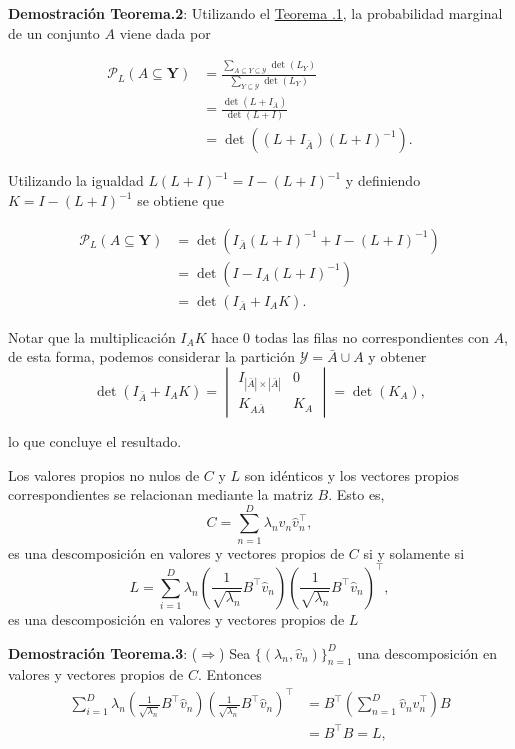 \begin{appendixs}
    \textbf{Demostración Teorema.2}: 
    Utilizando el \hyperlink{Teorema .1}{Teorema .1}, la probabilidad marginal de un conjunto $A$ viene dada por 

    \begin{align*}
    \mathcal{P}_{L}(A \subseteq \mathbf{Y}) & = \frac{\sum_{A \subseteq Y \subseteq \mathcal{Y}}\det(L_Y)}{\sum_{Y \subseteq \mathcal{Y}}\det(L_Y)} \\
    & = \frac{\det(L + I_{\bar{A}})}{\det(L+I)} \\
    & = \det((L + I_{\bar{A}})(L+I)^{-1}) . 
    \end{align*}
    
    Utilizando la igualdad $L(L+I)^{-1} = I - (L+I)^{-1}$ y definiendo $K = I - (L+I)^{-1}$ se obtiene que 
    
    \begin{align*}
    \mathcal{P}_L(A \subseteq \mathbf{Y}) & = \det(I_{\bar{A}}(L+I)^{-1} + I - (L+I)^{-1}) \\
    & = \det(I - I_{A}(L+I)^{-1}) \\
    &= \det(I_{\bar{A}} + I_{A}K) . 
    \end{align*} 
    
    Notar que la multiplicación $I_{A}K$ hace $0$ todas las filas no correspondientes con $A$, de esta forma, podemos considerar la partición $\mathcal{Y} = \bar{A} \cup A$ y obtener
    \[
    \det(I_{\bar{A}} + I_{A}K) = 
    \begin{vmatrix}
    I_{|\bar{A}| \times |\bar{A}| } & 0 \\
    K_{A\bar{A}} & K_A
    \end{vmatrix} = 
    \det(K_A) , 
    \]
    
    lo que concluye el resultado. 
    
    \begin{teo}\hypertarget{Teorema .3}{}
    Los valores propios no nulos de $C$ y $L$ son idénticos y los vectores propios correspondientes se relacionan mediante la matriz $B$. Esto es, 
    \[ 
    C = \sum_{n=1}^D \lambda_n\hat{v}_n\hat{v}^{\top}_n , 
    \]
    es una descomposición en valores y vectores propios de $C$ si y solamente si 
    \[
    L = \sum_{i=1}^D \lambda_n \left ( \frac{1}{\sqrt{\lambda_n}}B^{\top}\hat{v}_n\right ) \left ( \frac{1}{\sqrt{\lambda_n}}B^{\top}\hat{v}_n\right )^{\top} , 
    \]
    es una descomposición en valores y vectores propios de $L$
    \end{teo}
    
    \textbf{Demostración Teorema.3}: 
    ($\Rightarrow$) Sea  $\{(\lambda_n , \hat{v}_n)\}_{n=1}^D$ una descomposición en valores y vectores propios de $C$. Entonces
    \begin{align*}
    \sum_{i=1}^D \lambda_n \left ( \frac{1}{\sqrt{\lambda_n}}B^{\top}\hat{v}_n\right ) \left ( \frac{1}{\sqrt{\lambda_n}}B^{\top}\hat{v}_n\right )^{\top} &= B^{\top} \left ( \sum_{n=1}^D \hat{v}_n\hat{v}^{\top}_n \right ) B \\
    & = B^{\top}B = L , 
    \end{align*}
    

\end{appendixs}
